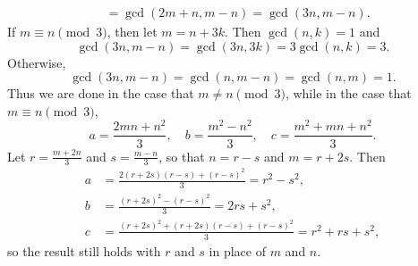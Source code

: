 \begin{enumerate}
\begin{align*}
&= \gcd(2m + n, m - n) = \gcd(3n, m - n).
\end{align*}
If $m\equiv n\pmod{3}$, then let $m = n + 3k$. Then $\gcd(n,k) = 1$ and
\begin{equation*}
\gcd(3n, m - n) = \gcd(3n,3k) = 3\gcd(n,k) = 3.
\end{equation*}
Otherwise,
\begin{equation*}
\gcd(3n, m - n) = \gcd(n, m - n) = \gcd(n,m) = 1.
\end{equation*}
Thus we are done in the case that $m\neq n\pmod{3}$, while in the case that $m\equiv n\pmod{3}$,
\begin{equation*}
a = \frac{2mn + n^2}{3},\quad b = \frac{m^2 - n^2}{3},\quad c = \frac{m^2 + mn + n^2}{3}.
\end{equation*}
Let $r = \frac{m + 2n}{3}$ and $s = \frac{m - n}{3}$, so that $n = r - s$ and $m = r + 2s$. Then
\begin{align*}
a &= \frac{2(r + 2s)(r - s) + (r - s)^2}{3} = r^2 - s^2, \\
b &= \frac{(r + 2s)^2 - (r - s)^2}{3} = 2rs + s^2, \\
c &= \frac{(r + 2s)^2 + (r + 2s)(r - s) + (r - s)^2}{3} = r^2 + rs + s^2,
\end{align*}
so the result still holds with $r$ and $s$ in place of $m$ and $n$.
\end{enumerate}